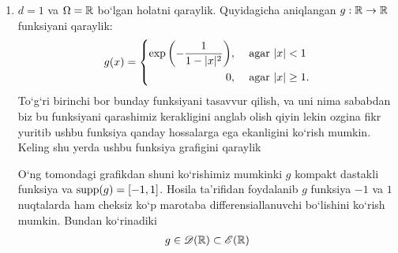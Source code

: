 \begin{example}
    \begin{enumerate}
        \item $d=1$ va $\Omega=\mathbb{R}$ bo`lgan holatni qaraylik. Quyidagicha aniqlangan $g:\mathbb{R}\rightarrow \mathbb{R}$ funksiyani qaraylik:
        \begin{equation}
            g(x)=\left\{\begin{aligned}
                \exp\left(-\frac{1}{1-\lvert x\rvert^2}\right)&, & \textnormal{ agar } & \lvert x\rvert <1 \\
                 0 &, & \textnormal{ agar } & \lvert x\rvert \ge 1.
            \end{aligned}\right. 
        \end{equation} 
    To`g`ri birinchi bor bunday funksiyani tasavvur qilish, va uni nima sababdan biz bu funksiyani qarashimiz kerakligini anglab olish qiyin lekin ozgina fikr yuritib ushbu funksiya qanday hossalarga ega ekanligini ko`rish mumkin. Keling shu yerda ushbu funksiya grafigini qaraylik \hfill \break

\noindent
    \begin{minipage}{0.89\textwidth}
    \begin{minipage}[b]{0.5\textwidth}
    O`ng tomondagi grafikdan shuni ko`\-ri\-shi\-miz mumkinki $g$ kom\-pakt das\-tak\-li funksiya va $\operatorname{supp}(g)=[-1,1]$. Hosila ta'rifidan foydalanib $g$ funk\-si\-ya $-1$ va $1$ nuq\-ta\-lar\-da ham cheksiz ko`p ma\-ro\-ta\-ba dif\-fe\-ren\-si\-al\-la\-nuv\-chi bo`\-li\-shi\-ni ko`rish mumkin. Bundan ko`rinadiki 
    \begin{align*} 
        g\in \mathscr{D}(\mathbb{R})\subset\mathscr{E}(\mathbb{R})
    \end{align*}
    \end{minipage}
    \hspace{0.02\textwidth}
    \begin{minipage}[b]{0.45\textwidth}
        \begin{figure}[H]
            \centering
            \label{fig:convkernel}
        

\end{figure}
\end{minipage}
\end{minipage}
\end{enumerate}
\end{example}
